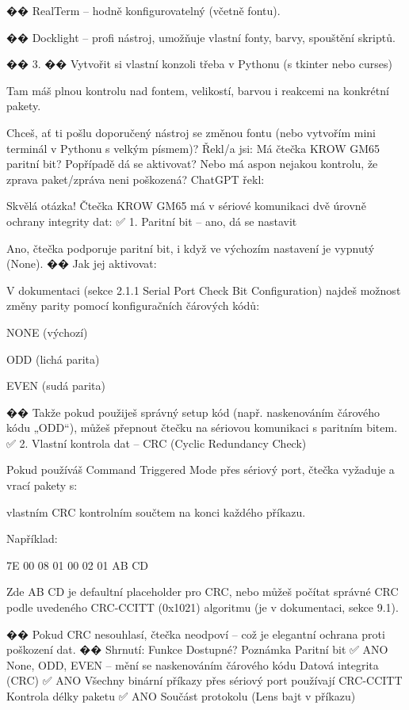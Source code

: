     �� RealTerm – hodně konfigurovatelný (včetně fontu).

    �� Docklight – profi nástroj, umožňuje vlastní fonty, barvy, spouštění skriptů.

�� 3. �� Vytvořit si vlastní konzoli třeba v Pythonu (s tkinter nebo curses)

Tam máš plnou kontrolu nad fontem, velikostí, barvou i reakcemi na konkrétní pakety.

Chceš, ať ti pošlu doporučený nástroj se změnou fontu (nebo vytvořím mini terminál v Pythonu s velkým písmem)?
Řekl/a jsi:
Má čtečka KROW GM65 paritní bit? Popřípadě dá se aktivovat? Nebo má aspon nejakou kontrolu, že zprava paket/zpráva neni poškozená?
ChatGPT řekl:

Skvělá otázka! Čtečka KROW GM65 má v sériové komunikaci dvě úrovně ochrany integrity dat:
✅ 1. Paritní bit – ano, dá se nastavit

Ano, čtečka podporuje paritní bit, i když ve výchozím nastavení je vypnutý (None).
�� Jak jej aktivovat:

V dokumentaci (sekce 2.1.1 Serial Port Check Bit Configuration) najdeš možnost změny parity pomocí konfiguračních čárových kódů:

    NONE (výchozí)

    ODD (lichá parita)

    EVEN (sudá parita)

�� Takže pokud použiješ správný setup kód (např. naskenováním čárového kódu „ODD“), můžeš přepnout čtečku na sériovou komunikaci s paritním bitem.
✅ 2. Vlastní kontrola dat – CRC (Cyclic Redundancy Check)

Pokud používáš Command Triggered Mode přes sériový port, čtečka vyžaduje a vrací pakety s:

    vlastním CRC kontrolním součtem na konci každého příkazu.

Například:

7E 00 08 01 00 02 01 AB CD

Zde AB CD je defaultní placeholder pro CRC, nebo můžeš počítat správné CRC podle uvedeného CRC-CCITT (0x1021) algoritmu (je v dokumentaci, sekce 9.1).

�� Pokud CRC nesouhlasí, čtečka neodpoví – což je elegantní ochrana proti poškození dat.
�� Shrnutí:
Funkce	Dostupné?	Poznámka
Paritní bit	✅ ANO	None, ODD, EVEN – mění se naskenováním čárového kódu
Datová integrita (CRC)	✅ ANO	Všechny binární příkazy přes sériový port používají CRC-CCITT
Kontrola délky paketu	✅ ANO	Součást protokolu (Lens bajt v příkazu)

